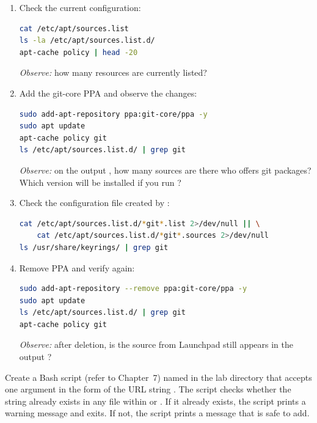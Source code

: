 \begin{enumerate}
\item Check the current  configuration:
\begin{lstlisting}[language=bash, caption={Check Active repository}]
cat /etc/apt/sources.list
ls -la /etc/apt/sources.list.d/
apt-cache policy | head -20
\end{lstlisting}
\textit{Observe:} how many  resources are currently listed?

\item Add the git-core PPA and observe the changes:
\begin{lstlisting}[language=bash, caption={Added PPA and checked the results}]
sudo add-apt-repository ppa:git-core/ppa -y
sudo apt update
apt-cache policy git
ls /etc/apt/sources.list.d/ | grep git
\end{lstlisting}
\textit{Observe:} on the output , how many sources are there
who offers git packages? Which version will be installed if you run ?

\item Check the configuration file created by :
\begin{lstlisting}[language=bash, caption={Checking the new PPA configuration file}]
cat /etc/apt/sources.list.d/*git*.list 2>/dev/null || \
    cat /etc/apt/sources.list.d/*git*.sources 2>/dev/null
ls /usr/share/keyrings/ | grep git
\end{lstlisting}

\item Remove PPA and verify again:
\begin{lstlisting}[language=bash, caption={Remove PPA and verify}]
sudo add-apt-repository --remove ppa:git-core/ppa -y
sudo apt update
ls /etc/apt/sources.list.d/ | grep git
apt-cache policy git
\end{lstlisting}
\textit{Observe:} after deletion, is the source from Launchpad still
appears in the output \cmd{apt-cache policy git}?
\end{enumerate}

\begin{challengebox}
Create a Bash script (refer to Chapter~7) named  in the lab directory that accepts one argument in the form of the URL string . The script checks whether the string already exists in any file within  or . If it already exists, the script prints a warning message and exits. If not, the script prints a message that  is safe to add.
\end{challengebox}

